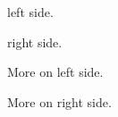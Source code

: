 \documentclass[12pt]{article}
\begin{document}
\begin{pages}
  \begin{Leftside}
    \beginnumbering
    \pstart
       left side. \lipsum[1-3]
    \pend
    \pstart
      \lipsum[4]
    \pend
    \endnumbering
  \end{Leftside}
  \begin{Rightside}
    \beginnumbering
    \pstart
       right side.\lipsum[1-3]
    \pend
    \pstart
      \lipsum[4]
    \pend
    \endnumbering
  \end{Rightside}
\end{pages}
\Pages

\begin{pages}
  \begin{Leftside}
    \beginnumbering
    \pstart
      More on  left side. \lipsum[1-3] %
    \pend
    \pstart
      \lipsum[4]
    \pend
    \endnumbering
  \end{Leftside}
  \begin{Rightside}
    \beginnumbering
    \pstart
      More on  right side. \lipsum[1-3]
    \pend
    \pstart
      \lipsum[4]
    \pend
    \endnumbering
  \end{Rightside}
\end{pages}
\Pages
\end{document}
